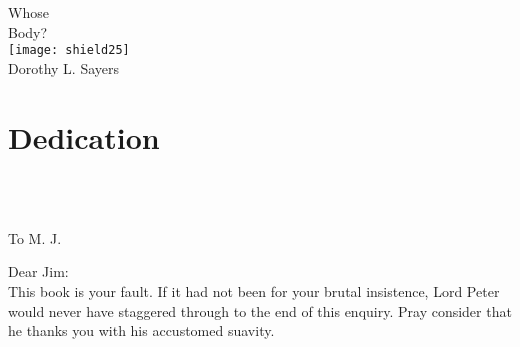 \documentclass[
paper=a5,
BCOR=7mm,
twoside,
DIV=calc,
12pt,
usegeometry,
chapterprefix,
headings=big]{scrbook} %
\newcommand{\HUGE}{\fontsize{120}{130}\selectfont}
\newcommand{\moderatelyhuge}{\fontsize{60}{70}\selectfont}
\begin{document}
\setlength{\epigraphwidth}{0.8\textwidth}
\renewcommand{\epigraphflush}{center}
\renewcommand{\sourceflush}{center}
\renewcommand*{\chaptermarkformat}{}
\renewcommand*{\chapterheadendvskip}{\vspace{10pt}}
\renewcommand*{\chapterheadstartvskip}{\vspace{0pt}}

\frontmatter
\pagestyle{empty}
\begin{titlepage}

   \recalctypearea

  \begin{center}\mytitlefont
{\HUGE Whose}\\
\vspace{0.5cm}
{\HUGE Body?}\\
\vfill
\texttt{[image: shield25]}\\
\vfill
{}\mytitlefont
{\moderatelyhuge Dorothy L. Sayers}\\
\end{center}


\end{titlepage}


\pagestyle{plain}

\renewcommand*\raggedchapter{\centering}


  \recalctypearea
\restoregeometry
{}

\tableofcontents
\clearpage

\chapter*{Dedication}
~\\
~\\
\begin{center}
To M. J.
\end{center}

\noindent Dear Jim:
~\\

This book is your fault. If it had not been for your brutal insistence, Lord Peter would never have staggered through to the end of this enquiry. Pray consider that he thanks you with his accustomed suavity.
\end{document}
